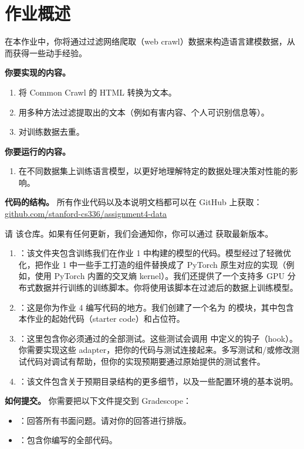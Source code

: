 \section{作业概述}

在本作业中，你将通过过滤网络爬取（web crawl）数据来构造语言建模数据，从而获得一些动手经验。

\textbf{你要实现的内容。}
\begin{enumerate}
  \item 将 Common Crawl 的 HTML 转换为文本。
  \item 用多种方法过滤提取出的文本（例如有害内容、个人可识别信息等）。
  \item 对训练数据去重。
\end{enumerate}

\textbf{你要运行的内容。}
\begin{enumerate}
  \item 在不同数据集上训练语言模型，以更好地理解特定的数据处理决策对性能的影响。
\end{enumerate}

\textbf{代码的结构。}
所有作业代码以及本说明文档都可以在 GitHub 上获取：
\url{github.com/stanford-cs336/assignment4-data}

请  该仓库。如果有任何更新，我们会通知你，你可以通过  获取最新版本。
\begin{enumerate}
  \item {}：该文件夹包含训练我们在作业 1 中构建的模型的代码。模型经过了轻微优化，把作业 1 中一些手工打造的组件替换成了 PyTorch 原生对应的实现（例如，使用 PyTorch 内置的交叉熵 kernel）。我们还提供了一个支持多 GPU 分布式数据并行训练的训练脚本。你将使用该脚本在过滤后的数据上训练模型。
  \item {}：这是你为作业 4 编写代码的地方。我们创建了一个名为  的模块，其中包含本作业的起始代码（starter code）和占位符。
  \item {}：这里包含你必须通过的全部测试。这些测试会调用  中定义的钩子（hook）。你需要实现这些 adapter，把你的代码与测试连接起来。多写测试和/或修改测试代码对调试有帮助，但你的实现预期要通过原始提供的测试套件。
  \item {}：该文件包含关于预期目录结构的更多细节，以及一些配置环境的基本说明。
\end{enumerate}

\textbf{如何提交。}
你需要把以下文件提交到 Gradescope：
\begin{itemize}
  \item {}：回答所有书面问题。请对你的回答进行排版。
  \item {}：包含你编写的全部代码。
\end{itemize}

